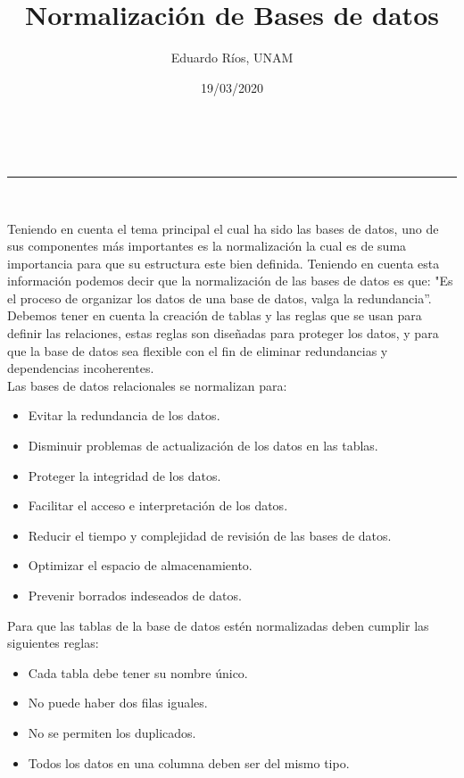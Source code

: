\documentclass[a4paper,11pt]{article}
\makeatletter
\newcommand{\linia}{\rule{\linewidth}{0.5pt}}
\theoremstyle{mytheor}
\renewcommand{\maketitle}{
\begin{center}
\vspace{2ex}
{\huge \textsc{\@title}}
\vspace{1ex}
\\
\linia\\
\@author \hfill \@date
\vspace{4ex}
\end{center}
}
\makeatother
\begin{document}
\title{Normalización de Bases de datos}

\author{Eduardo Ríos, UNAM}

\date{19/03/2020}

\maketitle

Teniendo en cuenta el tema principal el cual ha sido las bases de datos, uno de sus componentes más importantes es la normalización la cual es de suma importancia para que su estructura este bien definida. Teniendo en cuenta esta información podemos decir que la normalización de las bases de datos es que: "Es el proceso de organizar los datos de una base de datos, valga la redundancia”.\\

Debemos tener en cuenta la creación de tablas y las reglas que se usan para definir las relaciones, estas reglas son diseñadas para proteger los datos, y para que la base de datos sea flexible con el fin de eliminar redundancias y dependencias incoherentes.\\

Las bases de datos relacionales se normalizan para:
\begin{itemize}
    \item Evitar la redundancia de los datos.
    \item Disminuir problemas de actualización de los datos en las tablas.
    \item Proteger la integridad de los datos.
    \item Facilitar el acceso e interpretación de los datos.
    \item Reducir el tiempo y complejidad de revisión de las bases de datos.
    \item Optimizar el espacio de almacenamiento.
    \item Prevenir borrados indeseados de datos.\\
\end{itemize}
Para que las tablas de la base de datos estén normalizadas deben cumplir las siguientes reglas:
\begin{itemize}
\item Cada tabla debe tener su nombre único.
\item No puede haber dos filas iguales.
\item No se permiten los duplicados.
\item Todos los datos en una columna deben ser del mismo tipo.\\
\end{itemize}
\end{document}
